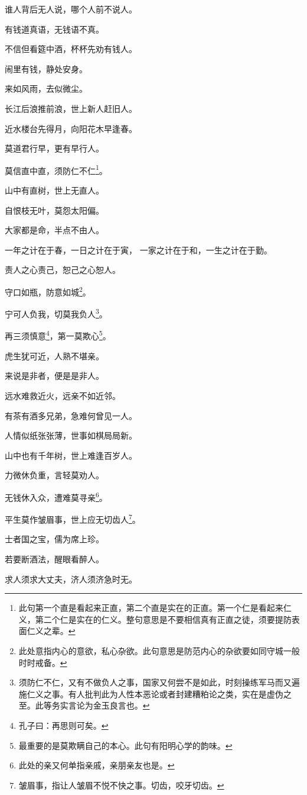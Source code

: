 \documentclass[12pt,oneside]{book}
\begin{document}
谁人背后无人说，哪个人前不说人。

有钱道真语，无钱语不真。

不信但看筵中酒，杯杯先劝有钱人。

闹里有钱，静处安身。

来如风雨，去似微尘。

长江后浪推前浪，世上新人赶旧人。

近水楼台先得月，向阳花木早逢春。

莫道君行早，更有早行人。

莫信直中直，须防仁不仁\footnote{此句第一个直是看起来正直，第二个直是实在的正直。第一个仁是看起来仁义，第二个仁是实在的仁义。整句意思是不要相信真有正直之徒，须要提防表面仁义之辈。}。

山中有直树，世上无直人。

自恨枝无叶，莫怨太阳偏。

大家都是命，半点不由人。

一年之计在于春，一日之计在于寅， 一家之计在于和，一生之计在于勤。

责人之心责己，恕己之心恕人。

守口如瓶，防意如城\footnote{此处意指内心的意欲，私心杂欲。此句意思是防范内心的杂欲要如同守城一般时时戒备。}。

宁可人负我，切莫我负人\footnote{须防仁不仁，又有不做负人之事，国家又何尝不是如此，时刻操练军马而又遍施仁义之事。有人批判此为人性本恶论或者封建糟粕论之类，实在是虚伪之至。此等务实言论为金玉良言也。}。

再三须慎意\footnote{孔子曰：再思则可矣。}，第一莫欺心\footnote{最重要的是莫欺瞒自己的本心。此句有阳明心学的韵味。}。

虎生犹可近，人熟不堪亲。

来说是非者，便是是非人。

远水难救近火，远亲不如近邻。

有茶有酒多兄弟，急难何曾见一人。

人情似纸张张薄，世事如棋局局新。

山中也有千年树，世上难逢百岁人。

力微休负重，言轻莫劝人。

无钱休入众，遭难莫寻亲\footnote{此处的亲又何单指亲戚，亲朋亲友也是。}。

平生莫作皱眉事，世上应无切齿人\footnote{皱眉事，指让人皱眉不悦不快之事。切齿，咬牙切齿。}。

士者国之宝，儒为席上珍。

若要断酒法，醒眼看醉人。

求人须求大丈夫，济人须济急时无。
\end{document}
